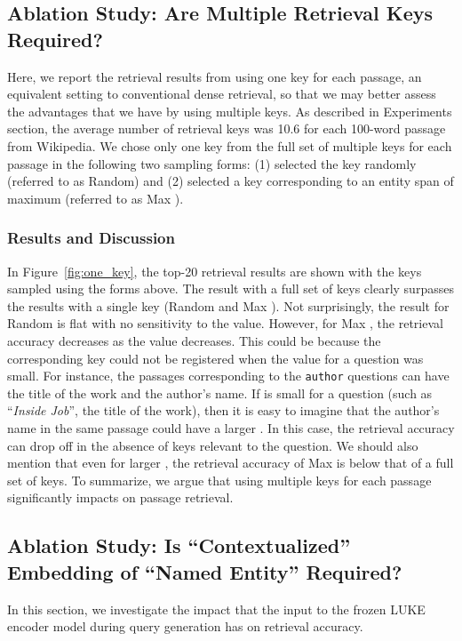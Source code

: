 \documentclass[letterpaper]{article} \usepackage{aaai23}  \usepackage{times}  \usepackage{helvet}  \usepackage{courier}  \usepackage[hyphens]{url}  \usepackage{graphicx} \urlstyle{rm} \def\UrlFont{\rm}  \usepackage{natbib}  \usepackage{caption} \frenchspacing  \setlength{\pdfpagewidth}{8.5in}  \setlength{\pdfpageheight}{11in}  \usepackage{algorithm}
\begin{document}
\subsection{Ablation Study: Are Multiple Retrieval Keys Required?}\label{sec:ablation_multiple_keys}
Here, we report the retrieval results from using one key for each passage, an equivalent setting to conventional dense retrieval, so that we may better assess the advantages that we have by using multiple keys.
As described in Experiments section, the average number of retrieval keys was 10.6 for each 100-word passage from Wikipedia.
We chose only one key from the full set of multiple keys for each passage in the following two sampling forms:
(1) selected the key randomly (referred to as Random) and (2) selected a key corresponding to an entity span of maximum  (referred to as Max ).

\subsubsection{Results and Discussion}
In Figure~\ref{fig:one_key}, the top-20 retrieval results are shown with the keys sampled using the forms above.
The result with a full set of keys clearly surpasses the results with a single key (Random and Max ).
Not surprisingly, the result for Random is flat with no sensitivity to the  value.
However, for Max , the retrieval accuracy decreases as the  value decreases.
This could be because the corresponding key could not be registered when the  value for a question was small.
For instance, the passages corresponding to the \texttt{\small author} questions can have the title of the work and the author's name.
If  is small for a question (such as ``\textit{Inside Job}'', the title of the work), then it is easy to imagine that the author's name in the same passage could have a larger .
In this case, the retrieval accuracy can drop off in the absence of keys relevant to the question.
We should also mention that even for larger , the retrieval accuracy of Max  is below that of a full set of keys.
To summarize, we argue that using multiple keys for each passage significantly impacts on passage retrieval.


\subsection{Ablation Study: Is ``Contextualized'' Embedding of ``Named Entity'' Required?}\label{sec:ablation_contextualized_embedding}
In this section, we investigate the impact that the input to the frozen LUKE encoder model during query generation has on retrieval accuracy.
\end{document}
